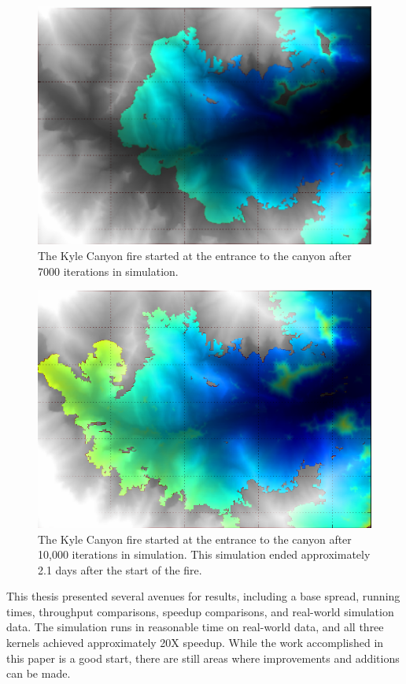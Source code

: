 \begin{figure}%
\centering
  \includegraphics[height=.4\textheight]{figures/results/7000.png}
  \caption{The Kyle Canyon fire started at the entrance to the canyon after 7000 iterations in simulation.}
  \label{fig:kyle_7000}
\end{figure} 
\begin{figure}%
\centering
  \includegraphics[height=.4\textheight]{figures/results/overlay_7.png}
  \caption{The Kyle Canyon fire started at the entrance to the canyon after 10,000 iterations in simulation. This simulation ended approximately 2.1 days after the start of the fire.}
  \label{fig:kyle_10000}
\end{figure} 

This thesis presented several avenues for results, including a base spread, running times, throughput comparisons, speedup comparisons, and real-world simulation data. The simulation runs in reasonable time on real-world data, and all three kernels achieved approximately 20X speedup. While the work accomplished in this paper is a good start, there are still areas where improvements and additions can be made. 

